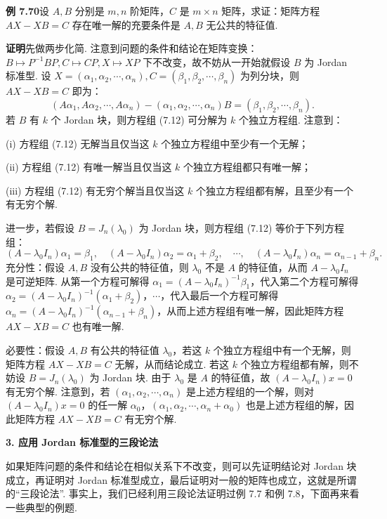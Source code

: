 \documentclass[UTF8, 12pt, fontset=fandol, oneside]{ctexart}
\begin{document}
\noindent\textbf{例 7.70}\quad 设 $A,B$ 分别是 $m,n$ 阶矩阵，$C$ 是 $m\times n$ 矩阵，求证：矩阵方程 $AX-XB=C$ 存在唯一解的充要条件是 $A,B$ 无公共的特征值.

\noindent\textbf{证明}\quad 先做两步化简. 注意到问题的条件和结论在矩阵变换：$B\mapsto P^{-1}BP,C\mapsto CP,X\mapsto XP$ 下不改变，故不妨从一开始就假设 $B$ 为 Jordan 标准型. 设 $X=(\alpha_1,\alpha_2,\cdots,\alpha_n),C=(\beta_1,\beta_2,\cdots,\beta_n)$ 为列分块，则 $AX-XB=C$ 即为：
\begin{equation}
(A\alpha_1,A\alpha_2,\cdots,A\alpha_n)-(\alpha_1,\alpha_2,\cdots,\alpha_n)B=(\beta_1,\beta_2,\cdots,\beta_n).
\tag{7.12}
\end{equation}
若 $B$ 有 $k$ 个 Jordan 块，则方程组 (7.12) 可分解为 $k$ 个独立方程组. 注意到：

(i) 方程组 (7.12) 无解当且仅当这 $k$ 个独立方程组中至少有一个无解；

(ii) 方程组 (7.12) 有唯一解当且仅当这 $k$ 个独立方程组都只有唯一解；

(iii) 方程组 (7.12) 有无穷个解当且仅当这 $k$ 个独立方程组都有解，且至少有一个有无穷个解.

进一步，若假设 $B=J_n(\lambda_0)$ 为 Jordan 块，则方程组 (7.12) 等价于下列方程组：
\[
(A-\lambda_0I_n)\alpha_1=\beta_1,\quad (A-\lambda_0I_n)\alpha_2=\alpha_1+\beta_2,\quad \cdots,\quad (A-\lambda_0I_n)\alpha_n=\alpha_{n-1}+\beta_n.
\]
充分性：假设 $A,B$ 没有公共的特征值，则 $\lambda_0$ 不是 $A$ 的特征值，从而 $A-\lambda_0I_n$ 是可逆矩阵. 从第一个方程可解得 $\alpha_1=(A-\lambda_0I_n)^{-1}\beta_1$，代入第二个方程可解得 $\alpha_2=(A-\lambda_0I_n)^{-1}(\alpha_1+\beta_2)$，$\cdots$，代入最后一个方程可解得 $\alpha_n=(A-\lambda_0I_n)^{-1}(\alpha_{n-1}+\beta_n)$，从而上述方程组有唯一解，因此矩阵方程 $AX-XB=C$ 也有唯一解.

必要性：假设 $A,B$ 有公共的特征值 $\lambda_0$，若这 $k$ 个独立方程组中有一个无解，则矩阵方程 $AX-XB=C$ 无解，从而结论成立. 若这 $k$ 个独立方程组都有解，则不妨设 $B=J_n(\lambda_0)$ 为 Jordan 块. 由于 $\lambda_0$ 是 $A$ 的特征值，故 $(A-\lambda_0I_n)x=0$ 有无穷个解. 注意到，若 $(\alpha_1,\alpha_2,\cdots,\alpha_n)$ 是上述方程组的一个解，则对 $(A-\lambda_0I_n)x=0$ 的任一解 $\alpha_0$，$(\alpha_1,\alpha_2,\cdots,\alpha_n+\alpha_0)$ 也是上述方程组的解，因此矩阵方程 $AX-XB=C$ 有无穷个解.

\noindent\textbf{3. 应用 Jordan 标准型的三段论法}

如果矩阵问题的条件和结论在相似关系下不改变，则可以先证明结论对 Jordan 块成立，再证明对 Jordan 标准型成立，最后证明对一般的矩阵也成立，这就是所谓的“三段论法”. 事实上，我们已经利用三段论法证明过例 7.7 和例 7.8，下面再来看一些典型的例题.
\end{document}
